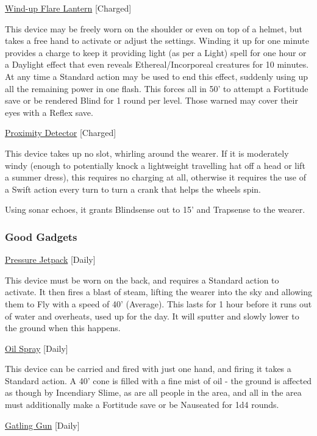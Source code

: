 \medskip\noindent\underline{Wind-up Flare Lantern} [Charged] 

\noindent This device may be freely worn on the shoulder or even on top of a helmet, but takes a free hand to activate or adjust the settings. Winding it up for one minute provides a charge to keep it providing light (as per a Light) spell for one hour or a Daylight effect that even reveals Ethereal/Incorporeal creatures for 10 minutes. At any time a Standard action may be used to end this effect, suddenly using up all the remaining power in one flash. This forces all in 50' to attempt a Fortitude save or be rendered Blind for 1 round per level. Those warned may cover their eyes with a Reflex save. 

\medskip\noindent\underline{Proximity Detector} [Charged] 

\noindent This device takes up no slot, whirling around the wearer. If it is moderately windy (enough to potentially knock a lightweight travelling hat off a head or lift a summer dress), this requires no charging at all, otherwise it requires the use of a Swift action every turn to turn a crank that helps the wheels spin. 

\smallskip\noindent Using sonar echoes, it grants Blindsense out to 15' and Trapsense to the wearer. 

\subsubsection{Good Gadgets}

\noindent\underline{Pressure Jetpack} [Daily] 

\noindent This device must be worn on the back, and requires a Standard action to activate. It then fires a blast of steam, lifting the wearer into the sky and allowing them to Fly with a speed of 40' (Average). This lasts for 1 hour before it runs out of water and overheats, used up for the day. It will sputter and slowly lower to the ground when this happens. 

\medskip\noindent\underline{Oil Spray} [Daily] 

\noindent This device can be carried and fired with just one hand, and firing it takes a Standard action. A 40' cone is filled with a fine mist of oil - the ground is affected as though by Incendiary Slime, as are all people in the area, and all in the area must additionally make a Fortitude save or be Nauseated for 1d4 rounds. 

\medskip\noindent\underline{Gatling Gun} [Daily] 

